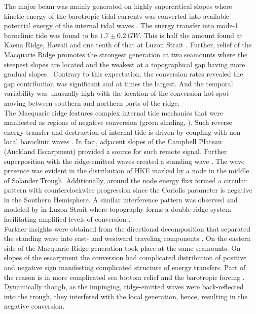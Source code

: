 \documentclass[12pt]{article}
\begin{document}
The major beam was mainly generated on highly supercritical slopes where kinetic energy of the 
barotropic tidal currents was converted into available potential energy of the internal tidal 
waves . The energy transfer into mode-1 baroclinic tide was found to be $1.7 
\pm 0.2~GW$. 
This is half the amount found at Kaena Ridge, Hawaii \citep{carter2008energetics} and one tenth of 
that at Luzon Strait \citep{alford2011energy, kerry2014impact}. Further, relief of 
the Macquarie 
Ridge 
promotes the strongest generation at two seamounts where the steepest slopes are 
located and 
the weakest at a topographical gap having more gradual slopes . 
Contrary to this expectation, 
the conversion rates  revealed the gap contribution was significant and 
at times the largest. And the temporal variability was unusually high with the location 
of the conversion hot spot moving between southern and northern parts of the ridge.\\

The Macquarie ridge features complex internal tide mechanics that were manifested as 
regions of negative conversion (green shading, ). Such reverse energy 
transfer and destruction of internal tide is driven by coupling with non-local baroclinic waves 
\citep{Kelly2010a}. In fact, adjacent slopes of the Campbell Plateau (Auckland Escarpment) provided 
a source for such remote signal. Further superposition with the 
ridge-emitted waves created a standing wave . The wave presence was 
evident in the distribution of HKE marked by a node in the middle of Solander Trough. Additionally, 
around the node energy flux formed a circular pattern  with 
counterclockwise progression since the Coriolis parameter is negative in the Southern Hemisphere. 
A similar interference pattern was observed and modeled by \cite{buijsman2014three} in Luzon 
Strait where topography forms a double-ridge system facilitating amplified levels of conversion 
\citep{buijsman2012double, klymak2013parameterizing}.\\

Further insights were obtained from the directional decomposition that separated the 
standing wave into east- and westward traveling components . On 
the eastern side of the Macquarie Ridge generation took 
place at the same seamounts. On slopes of the escarpment the conversion had complicated  
distribution of positive and negative sign manifesting complicated structure of energy transfers. 
Part of the reason is in more complicated sea bottom relief and the barotropic forcing 
. Dynamically though, as the impinging, ridge-emitted waves were 
back-reflected into the trough, they interfered with the local generation, hence, resulting in the 
negative conversion.\\
\end{document}
